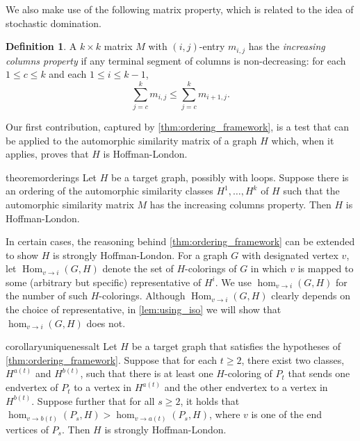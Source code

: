 \documentclass[11pt]{article}
\theoremstyle{definition}
\newtheorem{definition}[theorem]{Definition}
\newcommand{\Homclass}[4]{\Hom_{#1\to#2}(#3,#4)}
\newcommand{\homclass}[4]{\hom_{#1\to#2}(#3,#4)}
\DeclareMathOperator{\Hom}{Hom}
\begin{document}
We also make use of the following matrix property, which is related to the idea of stochastic domination.
\begin{definition} \label{def:incr-columns}
A $k \times k$ matrix $M$ with $(i,j)$-entry $m_{i,j}$ has the {\it increasing columns property} if any terminal segment of columns is non-decreasing: for each $1 \le c \le k$ and each $1 \le i \le k-1$,
\begin{equation} \label{inq:inc_cols}
\sum_{j=c}^k m_{i,j} \le \sum_{j=c}^k m_{i+1,j}.
\end{equation}
\end{definition}

Our first contribution, captured by \cref{thm:ordering_framework}, is a test that can be applied to the automorphic similarity matrix of a graph $H$ which, when it applies, proves that $H$ is Hoffman-London. 
\begin{restatable}{theorem}{orderings} \label{thm:ordering_framework}
Let $H$ be a target graph, possibly with loops. Suppose there is an ordering of the automorphic similarity classes $H^1, \ldots, H^k$ of $H$ such that the automorphic similarity matrix $M$ has the increasing columns property. Then $H$ is Hoffman-London. 
\end{restatable}

In certain cases, the reasoning behind \cref{thm:ordering_framework} can be extended to show $H$ is strongly Hoffman-London. For a graph $G$ with designated vertex $v$, let $\Homclass{v}{i}{G}{H}$ denote the set of $H$-colorings of $G$ in which $v$ is mapped to some (arbitrary but specific) representative of $H^i$. We use $\homclass{v}{i}{G}{H}$ for the number of such $H$-colorings. Although $\Homclass{v}{i}{G}{H}$ clearly depends on the choice of representative, in \cref{lem:using_iso} we will show that $\homclass{v}{i}{G}{H}$ does not.

\begin{restatable}{corollary}{uniquenessalt} \label{cor:uniquenessalt}
Let $H$ be a target graph that satisfies the hypotheses of \cref{thm:ordering_framework}. Suppose that for each $t \ge 2$, there exist two classes, $H^{a(t)}$ and $H^{b(t)}$, such that there is at least one $H$-coloring of $P_t$ that sends one endvertex of $P_t$ to a vertex in $H^{a(t)}$ and the other endvertex to a vertex in $H^{b(t)}$. Suppose further that for all $s \ge 2$, it holds that $\homclass{v}{b(t)}{P_s}{H} > \homclass{v}{a(t)}{P_s}{H}$, where $v$ is one of the end vertices of $P_s$. Then $H$ is strongly Hoffman-London. 
\end{restatable}
\end{document}
